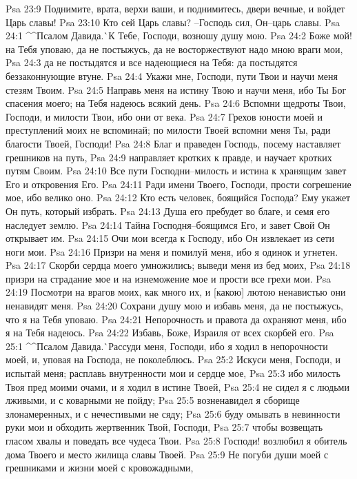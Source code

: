 Psa 23:9  Поднимите, врата, верхи ваши, и поднимитесь, двери вечные, и войдет Царь славы!
Psa 23:10  Кто сей Царь славы? --Господь сил, Он--царь славы.
Psa 24:1  ^^Псалом Давида.^^ К Тебе, Господи, возношу душу мою.
Psa 24:2  Боже мой! на Тебя уповаю, да не постыжусь, да не восторжествуют надо мною враги мои,
Psa 24:3  да не постыдятся и все надеющиеся на Тебя: да постыдятся беззаконнующие втуне.
Psa 24:4  Укажи мне, Господи, пути Твои и научи меня стезям Твоим.
Psa 24:5  Направь меня на истину Твою и научи меня, ибо Ты Бог спасения моего; на Тебя надеюсь всякий день.
Psa 24:6  Вспомни щедроты Твои, Господи, и милости Твои, ибо они от века.
Psa 24:7  Грехов юности моей и преступлений моих не вспоминай; по милости Твоей вспомни меня Ты, ради благости Твоей, Господи!
Psa 24:8  Благ и праведен Господь, посему наставляет грешников на путь,
Psa 24:9  направляет кротких к правде, и научает кротких путям Своим.
Psa 24:10  Все пути Господни--милость и истина к хранящим завет Его и откровения Его.
Psa 24:11  Ради имени Твоего, Господи, прости согрешение мое, ибо велико оно.
Psa 24:12  Кто есть человек, боящийся Господа? Ему укажет Он путь, который избрать.
Psa 24:13  Душа его пребудет во благе, и семя его наследует землю.
Psa 24:14  Тайна Господня--боящимся Его, и завет Свой Он открывает им.
Psa 24:15  Очи мои всегда к Господу, ибо Он извлекает из сети ноги мои.
Psa 24:16  Призри на меня и помилуй меня, ибо я одинок и угнетен.
Psa 24:17  Скорби сердца моего умножились; выведи меня из бед моих,
Psa 24:18  призри на страдание мое и на изнеможение мое и прости все грехи мои.
Psa 24:19  Посмотри на врагов моих, как много их, и [какою] лютою ненавистью они ненавидят меня.
Psa 24:20  Сохрани душу мою и избавь меня, да не постыжусь, что я на Тебя уповаю.
Psa 24:21  Непорочность и правота да охраняют меня, ибо я на Тебя надеюсь.
Psa 24:22  Избавь, Боже, Израиля от всех скорбей его.
Psa 25:1  ^^Псалом Давида.^^ Рассуди меня, Господи, ибо я ходил в непорочности моей, и, уповая на Господа, не поколеблюсь.
Psa 25:2  Искуси меня, Господи, и испытай меня; расплавь внутренности мои и сердце мое,
Psa 25:3  ибо милость Твоя пред моими очами, и я ходил в истине Твоей,
Psa 25:4  не сидел я с людьми лживыми, и с коварными не пойду;
Psa 25:5  возненавидел я сборище злонамеренных, и с нечестивыми не сяду;
Psa 25:6  буду омывать в невинности руки мои и обходить жертвенник Твой, Господи,
Psa 25:7  чтобы возвещать гласом хвалы и поведать все чудеса Твои.
Psa 25:8  Господи! возлюбил я обитель дома Твоего и место жилища славы Твоей.
Psa 25:9  Не погуби души моей с грешниками и жизни моей с кровожадными,
